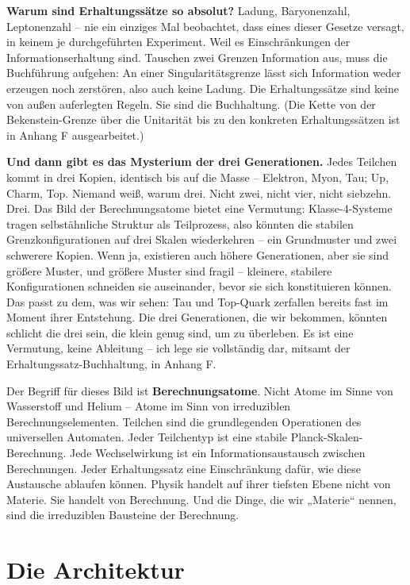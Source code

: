 \documentclass[11pt, twoside, openright]{book}
\begin{document}
\textbf{Warum sind Erhaltungssätze so absolut?} Ladung, Baryonenzahl, Leptonenzahl -- nie ein einziges Mal beobachtet, dass eines dieser Gesetze versagt, in keinem je durchgeführten Experiment. Weil es Einschränkungen der Informationserhaltung sind. Tauschen zwei Grenzen Information aus, muss die Buchführung aufgehen: An einer Singularitätsgrenze lässt sich Information weder erzeugen noch zerstören, also auch keine Ladung. Die Erhaltungssätze sind keine von außen auferlegten Regeln. Sie sind die Buchhaltung. (Die Kette von der Bekenstein-Grenze über die Unitarität bis zu den konkreten Erhaltungssätzen ist in Anhang F ausgearbeitet.)

\textbf{Und dann gibt es das Mysterium der drei Generationen.} Jedes Teilchen kommt in drei Kopien, identisch bis auf die Masse -- Elektron, Myon, Tau; Up, Charm, Top. Niemand weiß, warum drei. Nicht zwei, nicht vier, nicht siebzehn. Drei. Das Bild der Berechnungsatome bietet eine Vermutung: Klasse-4-Systeme tragen selbstähnliche Struktur als Teilprozess, also könnten die stabilen Grenzkonfigurationen auf drei Skalen wiederkehren -- ein Grundmuster und zwei schwerere Kopien. Wenn ja, existieren auch höhere Generationen, aber sie sind größere Muster, und größere Muster sind fragil -- kleinere, stabilere Konfigurationen schneiden sie auseinander, bevor sie sich konstituieren können. Das passt zu dem, was wir sehen: Tau und Top-Quark zerfallen bereits fast im Moment ihrer Entstehung. Die drei Generationen, die wir bekommen, könnten schlicht die drei sein, die klein genug sind, um zu überleben. Es ist eine Vermutung, keine Ableitung -- ich lege sie vollständig dar, mitsamt der Erhaltungssatz-Buchhaltung, in Anhang F.

Der Begriff für dieses Bild ist \textbf{Berechnungsatome}. Nicht Atome im Sinne von Wasserstoff und Helium -- Atome im Sinn von irreduziblen Berechnungselementen. Teilchen sind die grundlegenden Operationen des universellen Automaten. Jeder Teilchentyp ist eine stabile Planck-Skalen-Berechnung. Jede Wechselwirkung ist ein Informationsaustausch zwischen Berechnungen. Jeder Erhaltungssatz eine Einschränkung dafür, wie diese Austausche ablaufen können. Physik handelt auf ihrer tiefsten Ebene nicht von Materie. Sie handelt von Berechnung. Und die Dinge, die wir „Materie“ nennen, sind die irreduziblen Bausteine der Berechnung.


\section*{Die Architektur}
\end{document}
